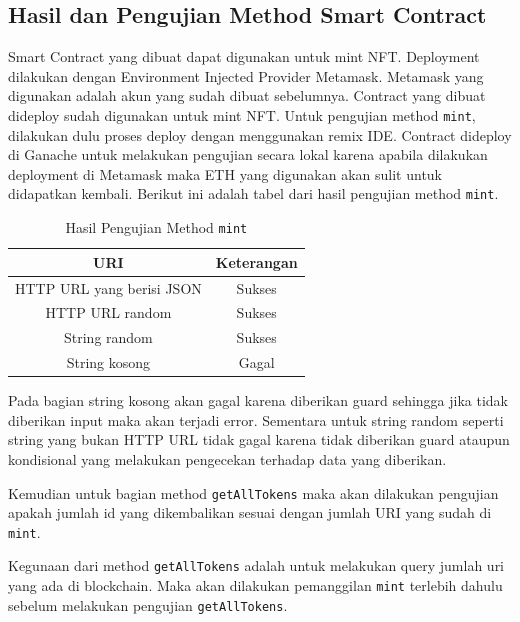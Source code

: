 \subsection{Hasil dan Pengujian Method Smart Contract}
Smart Contract yang dibuat dapat digunakan untuk mint NFT. Deployment dilakukan dengan Environment Injected Provider Metamask.
Metamask yang digunakan adalah akun yang sudah dibuat sebelumnya. Contract yang dibuat dideploy sudah digunakan untuk mint NFT.
Untuk pengujian method \texttt{mint}, dilakukan dulu proses deploy dengan menggunakan remix IDE. Contract dideploy di Ganache untuk melakukan pengujian secara lokal karena apabila dilakukan deployment di
Metamask maka ETH yang digunakan akan sulit untuk didapatkan kembali. Berikut ini adalah tabel dari hasil pengujian method \texttt{mint}.
\begin{longtable}{|c|c|}
  \caption{Hasil Pengujian Method \texttt{mint}}
  \label{tb:UjiMint}                              \\
  \hline
  \rowcolor[HTML]{C0C0C0}
  \textbf{URI}              & \textbf{Keterangan} \\
  \hline
  HTTP URL yang berisi JSON & Sukses              \\
  HTTP URL random           & Sukses              \\
  String random             & Sukses              \\
  String kosong             & Gagal               \\
  \hline
\end{longtable}

Pada bagian string kosong akan gagal karena diberikan guard sehingga jika tidak diberikan input maka akan terjadi error.
Sementara untuk string random seperti string yang bukan HTTP URL tidak gagal karena tidak diberikan guard ataupun kondisional yang melakukan
pengecekan terhadap data yang diberikan.

Kemudian untuk bagian method \texttt{getAllTokens} maka akan dilakukan pengujian apakah jumlah id yang dikembalikan sesuai dengan jumlah URI yang sudah di \texttt{mint}.

Kegunaan dari method \texttt{getAllTokens} adalah untuk melakukan query jumlah uri yang ada di blockchain. Maka akan dilakukan pemanggilan \texttt{mint} terlebih dahulu
sebelum melakukan pengujian \texttt{getAllTokens}.

